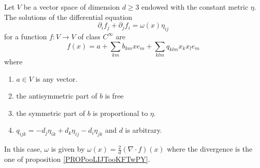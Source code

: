 \begin{lemma}
    Let \( V\) be a vector space of dimension \( d\geq 3\) endowed with the constant metric \( \eta\). The solutions of the differential equation
    \begin{equation}    \label{EQooVBIMooOBKAKQ}
        \partial_if_j+\partial_jf_i=\omega(x)\eta_{ij}
    \end{equation}
    for a function \( f\colon V\to V\) of class \(  C^{\infty}\) are
    \begin{equation}
        f(x)=a+\sum_{km}b_{km}xe_m+\sum_{klm}q_{klm}x_kx_le_m
    \end{equation}
    where
    \begin{enumerate}
        \item
            \( a\in V\) is any vector.
        \item
            the antisymmetric part of \( b\) is free
        \item
            the symmetric part of \( b\) is proportional to \( \eta\).
        \item
            \( q_{ijk}=-d_j\eta_{ik}+d_k\eta_{ij}-d_i\eta_{jk}\) and \( d\) is arbitrary.
    \end{enumerate}
    In this case, \( \omega\) is given by \( \omega(x)=\frac{ 2 }{ d }(\nabla\cdot f)(x)\) where the divergence is the one of proposition \ref{PROPooLIJTooKFTwPY}.
\end{lemma}

